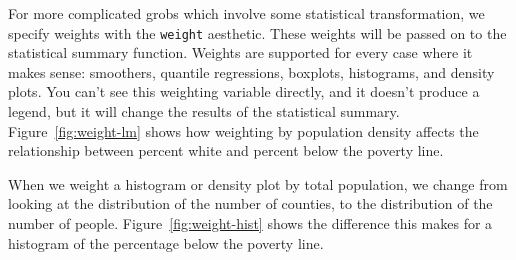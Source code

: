 For more complicated grobs which involve some statistical transformation, we specify weights with the {\tt weight} aesthetic.  These weights will be passed on to the statistical summary function.  Weights are supported for every case where it makes sense: smoothers, quantile regressions, boxplots, histograms, and density plots.  You can't see this weighting variable directly, and it doesn't produce a legend, but it will change the results of the statistical summary.  Figure~\ref{fig:weight-lm} shows how weighting by population density affects the relationship between percent white and percent below the poverty line.

%


When we weight a histogram or density plot by total population, we change from looking at the distribution of the number of counties, to the distribution of the number of people. Figure~\ref{fig:weight-hist} shows the difference this makes for a histogram of the percentage below the poverty line. 

%



